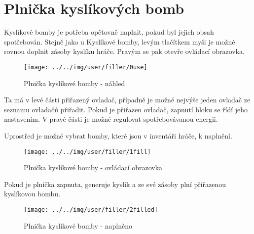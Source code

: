 
\section{Plnička kyslíkových bomb}

Kyslíkové bomby je potřeba opětovně naplnit, pokud byl jejich obsah spotřebován. Stejně jako u Kyslíkové bomby, levým tlačítkem myši je možné rovnou doplnit zásoby kyslíku hráče. Pravým se pak otevře ovládací obrazovka.

\begin{figure}[!ht]\centering
\texttt{[image: ../../img/user/filler/0use]}

\caption{Plnička kyslíkové bomby - náhled}
\label{fig:user_filler_0use}

\end{figure}

\FloatBarrier

Ta má v levé části přiřazený ovladač, případně je možné nejvýše jeden ovladač ze seznamu ovladačů přiřadit. Pokud je přiřazen ovladač, zapnutí bloku se řídí jeho nastavením. V pravé části je možné regulovat spotřebovávanou energii.

Uprostřed je možné vybrat bomby, které jsou v inventáři hráče, k naplnění.

\begin{figure}[!ht]\centering
\texttt{[image: ../../img/user/filler/1fill]}

\caption{Plnička kyslíkové bomby - ovládací obrazovka}
\label{fig:user_filler_1fill}

\end{figure}

\FloatBarrier

Pokud je plnička zapnuta, generuje kyslík a ze své zásoby plní přiřazenou kyslíkovou bombu.

\begin{figure}[!ht]\centering
\texttt{[image: ../../img/user/filler/2filled]}

\caption{Plnička kyslíkové bomby - naplněno}
\label{fig:user_filler_2filled}

\end{figure}



\FloatBarrier